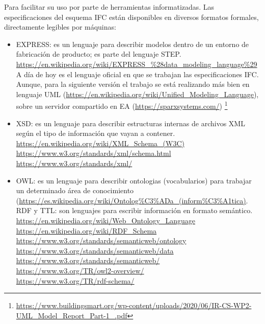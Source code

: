\documentclass[spanish,10pt,a4paper,final,oneside]{article}
\begin{document}
\vspace{0.3cm}
Para facilitar su uso por parte de herramientas informatizadas. Las especificaciones del esquema IFC están disponibles en diversos formatos formales, directamente legibles por máquinas:
\begin{itemize}
\item EXPRESS: es un lenguaje para describir modelos dentro de un entorno de fabricación de producto; es parte del lenguaje STEP.
\\ \url{https://en.wikipedia.org/wiki/EXPRESS_%28data_modeling_language%29}
\\A día de hoy es el lenguaje oficial en que se trabajan las especificaciones IFC. 
\\Aunque, para la siguiente versión el trabajo se está realizando más bien en lenguaje UML (\url{https://en.wikipedia.org/wiki/Unified_Modeling_Language}), sobre un servidor compartido en EA (\url{https://sparxsystems.com/}) \footnote{\url{https://www.buildingsmart.org/wp-content/uploads/2020/06/IR-CS-WP2-UML_Model_Report_Part-1_.pdf}} 

\item XSD: es un lenguaje para describir estructuras internas de archivos XML según el tipo de información que vayan a contener.
\\ \url{https://en.wikipedia.org/wiki/XML_Schema_(W3C)} 
\\ \url{https://www.w3.org/standards/xml/schema.html}
\\ \url{https://www.w3.org/standards/xml/}

\item OWL: es un lenguaje para describir ontologias (vocabularios) para trabajar un determinado área de conocimiento ({\small \url{https://es.wikipedia.org/wiki/Ontolog%C3%ADa_(inform%C3%A1tica)}}.
\\ RDF y TTL: son lenguajes para escribir información en formato semántico.
\\ \url{https://en.wikipedia.org/wiki/Web_Ontology_Language}
\\ \url{https://en.wikipedia.org/wiki/RDF_Schema}
\\ \url{https://www.w3.org/standards/semanticweb/ontology}
\\ \url{https://www.w3.org/standards/semanticweb/data}
\\ \url{https://www.w3.org/standards/semanticweb/}
\\ \url{https://www.w3.org/TR/owl2-overview/}
\\ \url{https://www.w3.org/TR/rdf-schema/}
\end{itemize}
\end{document}
